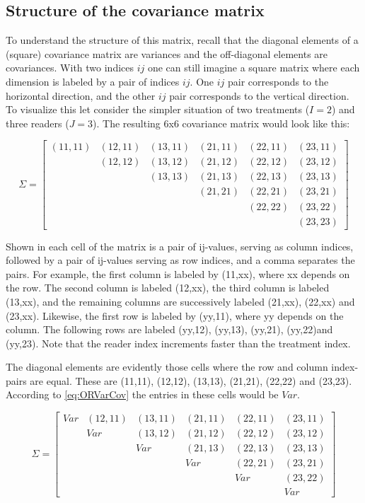 \documentclass[
]{book}
\begin{document}
\hypertarget{StrCovMatrix}{%
\subsection{Structure of the covariance matrix}\label{StrCovMatrix}}

To understand the structure of this matrix, recall that the diagonal elements of a (square) covariance matrix are variances and the off-diagonal elements are covariances. With two indices \(ij\) one can still imagine a square matrix where each dimension is labeled by a pair of indices \(ij\). One \(ij\) pair corresponds to the horizontal direction, and the other \(ij\) pair corresponds to the vertical direction. To visualize this let consider the simpler situation of two treatments (\(I = 2\)) and three readers (\(J = 3\)). The resulting 6x6 covariance matrix would look like this:

\[
\Sigma=
\begin{bmatrix}
(11,11) & (12,11) & (13,11) & (21,11) & (22,11) & (23,11) \\
& (12,12) & (13,12) & (21,12) & (22,12) & (23,12) \\ 
& & (13,13) & (21,13) & (22,13) & (23,13) \\ 
& & & (21,21) & (22,21) & (23,21) \\
& & & & (22,22) & (23,22) \\ 
& & & & & (23,23)
\end{bmatrix}
\]

Shown in each cell of the matrix is a pair of ij-values, serving as column indices, followed by a pair of ij-values serving as row indices, and a comma separates the pairs. For example, the first column is labeled by (11,xx), where xx depends on the row. The second column is labeled (12,xx), the third column is labeled (13,xx), and the remaining columns are successively labeled (21,xx), (22,xx) and (23,xx). Likewise, the first row is labeled by (yy,11), where yy depends on the column. The following rows are labeled (yy,12), (yy,13), (yy,21), (yy,22)and (yy,23). Note that the reader index increments faster than the treatment index.

The diagonal elements are evidently those cells where the row and column index-pairs are equal. These are (11,11), (12,12), (13,13), (21,21), (22,22) and (23,23). According to \eqref{eq:ORVarCov} the entries in these cells would be \(Var\).

\[
\Sigma=
\begin{bmatrix}
Var & (12,11) & (13,11) & (21,11) & (22,11) & (23,11) \\
& Var & (13,12) & (21,12) & (22,12) & (23,12) \\ 
& & Var & (21,13) & (22,13) & (23,13) \\ 
& & & Var & (22,21) & (23,21) \\
& & & & Var & (23,22) \\ 
& & & & & Var
\end{bmatrix}
\]
\end{document}
